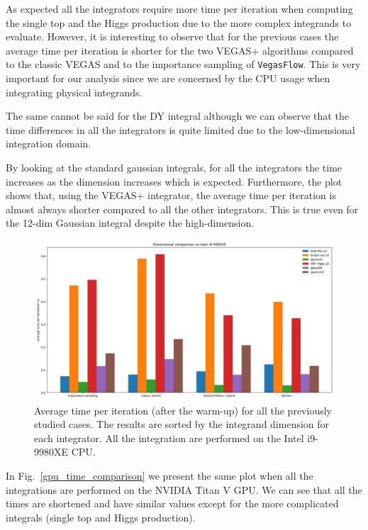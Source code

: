 \documentclass[../main/main.tex]{subfiles}
\begin{document}
As expected all the integrators require more time per iteration when computing the single top and the Higgs production due to the more complex integrands to evaluate. However, it is interesting to observe that for the previous cases the average time per iteration is shorter for the two VEGAS+ algorithms compared to the classic VEGAS and to the importance sampling of \texttt{VegasFlow}.
This is very important for our analysis since we are concerned by the CPU usage when integrating physical integrands. 

The same cannot be said for the DY integral although we can observe that the time differences in all the integrators is quite limited due to the low-dimensional integration domain.

By looking at the standard gaussian integrals, for all the integrators the time increases as the dimension increases which is expected. Furthermore, the plot shows that, using the VEGAS+ integrator, the average time per iteration is almost always shorter compared to all the other integrators. This is true even for the 12-dim Gaussian integral despite the high-dimension.


\begin{figure}[h]
	\centering
	\includegraphics[width=\textwidth]{../images/CPU_final.png}
	\caption{Average time per iteration (after the warm-up) for all the previously studied cases. The results are sorted by the integrand dimension for each integrator. All the integration are performed on the Intel i9-9980XE CPU. }
	\label{cpu_time_comparison}
\end{figure}

In Fig.~\ref{gpu_time_comparison} we present the same plot when all the integrations are performed on the NVIDIA Titan V GPU. We can see that all the times are shortened and have similar values except for the more complicated integrals (single top and Higgs production).
\end{document}
